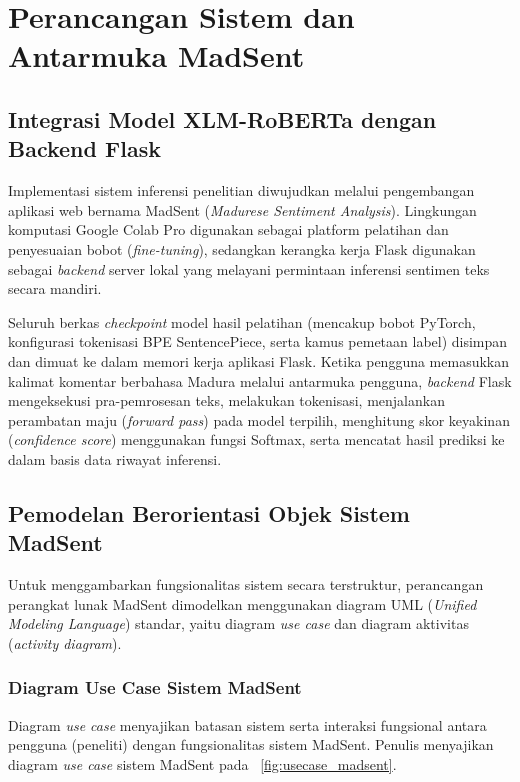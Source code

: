 \section{Perancangan Sistem dan Antarmuka MadSent}

\subsection{Integrasi Model XLM-RoBERTa dengan Backend Flask}

Implementasi sistem inferensi penelitian diwujudkan melalui pengembangan aplikasi web bernama MadSent (\textit{Madurese Sentiment Analysis}). Lingkungan komputasi Google Colab Pro digunakan sebagai platform pelatihan dan penyesuaian bobot (\textit{fine-tuning}), sedangkan kerangka kerja Flask digunakan sebagai \textit{backend} server lokal yang melayani permintaan inferensi sentimen teks secara mandiri.

Seluruh berkas \textit{checkpoint} model hasil pelatihan (mencakup bobot PyTorch, konfigurasi tokenisasi BPE SentencePiece, serta kamus pemetaan label) disimpan dan dimuat ke dalam memori kerja aplikasi Flask. Ketika pengguna memasukkan kalimat komentar berbahasa Madura melalui antarmuka pengguna, \textit{backend} Flask mengeksekusi pra-pemrosesan teks, melakukan tokenisasi, menjalankan perambatan maju (\textit{forward pass}) pada model terpilih, menghitung skor keyakinan (\textit{confidence score}) menggunakan fungsi Softmax, serta mencatat hasil prediksi ke dalam basis data riwayat inferensi.

\subsection{Pemodelan Berorientasi Objek Sistem MadSent}

Untuk menggambarkan fungsionalitas sistem secara terstruktur, perancangan perangkat lunak MadSent dimodelkan menggunakan diagram UML (\textit{Unified Modeling Language}) standar, yaitu diagram \textit{use case} dan diagram aktivitas (\textit{activity diagram}).

\subsubsection{Diagram Use Case Sistem MadSent}

Diagram \textit{use case} menyajikan batasan sistem serta interaksi fungsional antara pengguna (peneliti) dengan fungsionalitas sistem MadSent. Penulis menyajikan diagram \textit{use case} sistem MadSent pada \figurename~\ref{fig:usecase_madsent}.

